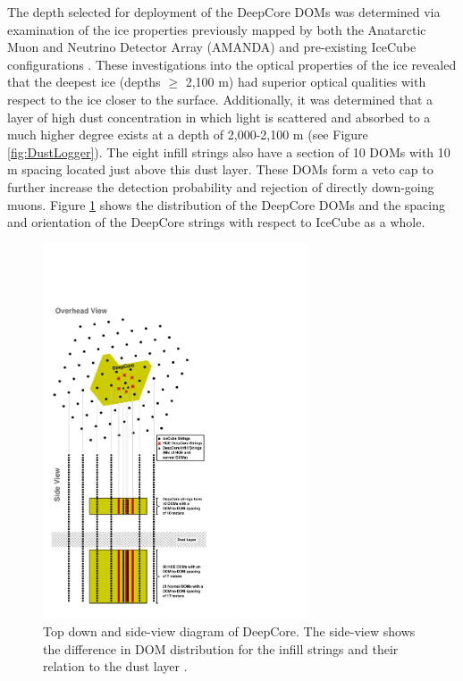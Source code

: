 \documentclass{gatech-thesis}
\begin{document}
The depth selected for deployment of the DeepCore DOMs was determined via examination of the ice properties previously mapped by both the Anatarctic Muon and Neutrino Detector Array (AMANDA) \cite{2006JGRD..11113203A} and pre-existing IceCube configurations \cite{2013JGlac..59.1117.}. These investigations into the optical properties of the ice revealed that the deepest ice (depths $\geq$ 2,100 m) had superior optical qualities with respect to the ice closer to the surface. Additionally, it was determined that a layer of high dust concentration in which light is scattered and absorbed to a much higher degree exists at a depth of 2,000-2,100 m (see Figure \ref{fig:DustLogger}). The eight infill strings also have a section of 10 DOMs with 10 m spacing located just above this dust layer. These DOMs form a veto cap to further increase the detection probability and rejection of directly down-going muons. Figure \ref{fig:DeepCoreSchematic} shows the distribution of the DeepCore DOMs and the spacing and orientation of the DeepCore strings with respect to IceCube as a whole.

\begin{figure}[ht]
  \begin{center}
    \includegraphics[width=0.7\textwidth,keepaspectratio]{IC86EDC_DeepCoreDiagram.pdf}
  \end{center}
  \caption{Top down and side-view diagram of DeepCore. The side-view shows the difference in DOM distribution for the infill strings and their relation to the dust layer \cite{2012APh....35..615A}.}
  \label{fig:DeepCoreSchematic}
\end{figure}
\end{document}
